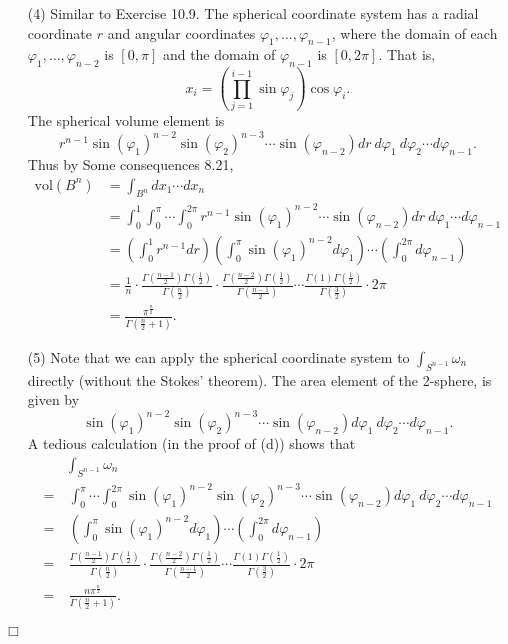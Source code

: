 \documentclass{article}
\begin{document}
\begin{enumerate}
\item[(4)]
  Similar to Exercise 10.9.
  The spherical coordinate system has a radial coordinate $r$ and
  angular coordinates $\varphi_1, \ldots, \varphi_{n-1}$,
  where the domain of each $\varphi_1, \ldots, \varphi_{n-2}$ is $[0,\pi]$
  and the domain of $\varphi_{n-1}$ is $[0,2\pi]$.
  That is,
  \[
    x_i = \left( \prod_{j=1}^{i-1} \sin\varphi_j \right) \cos\varphi_i.
  \]
  The spherical volume element is
  \[
    r^{n-1} \sin(\varphi_1)^{n-2} \sin(\varphi_2)^{n-3} \cdots \sin(\varphi_{n-2})
    dr \: d\varphi_1 \: d\varphi_2 \cdots d\varphi_{n-1}.
  \]
  Thus by Some consequences 8.21,
  \begin{align*}
    \mathrm{vol}(B^n)
    &= \int_{B^{n}} dx_1 \cdots dx_n \\
    &= \int_{0}^{1} \int_{0}^{\pi} \cdots \int_{0}^{2\pi}
      r^{n-1} \sin(\varphi_1)^{n-2} \cdots \sin(\varphi_{n-2})
      dr \: d\varphi_1 \cdots d\varphi_{n-1} \\
    &= \left( \int_{0}^{1} r^{n-1} dr \right)
      \left(\int_{0}^{\pi} \sin(\varphi_1)^{n-2} d\varphi_1 \right)
      \cdots
      \left(\int_{0}^{2\pi} d\varphi_{n-1} \right) \\
    &= \frac{1}{n}
      \cdot \frac{\Gamma(\frac{n-1}{2})\Gamma(\frac{1}{2})}{\Gamma(\frac{n}{2})}
      \cdot \frac{\Gamma(\frac{n-2}{2})\Gamma(\frac{1}{2})}{\Gamma(\frac{n-1}{2})}
      \cdots
      \frac{\Gamma(1)\Gamma(\frac{1}{2})}{\Gamma(\frac{3}{2})} \cdot 2\pi \\
    &= \frac{\pi^{\frac{n}{2}}}{\Gamma\left(\frac{n}{2}+1\right)}.
  \end{align*}

\item[(5)]
  Note that we can apply the spherical coordinate system
  to $\int_{S^{n-1}} \omega_n$ directly (without the Stokes' theorem).
  The area element of the 2-sphere, is given by
  \[
    \sin(\varphi_1)^{n-2} \sin(\varphi_2)^{n-3} \cdots \sin(\varphi_{n-2})
    d\varphi_1 \: d\varphi_2 \cdots d\varphi_{n-1}.
  \]
  A tedious calculation (in the proof of (d)) shows that
  \begin{align*}
    &\int_{S^{n-1}} \omega_n \\
    =& \: \int_{0}^{\pi} \cdots \int_{0}^{2\pi}
      \sin(\varphi_1)^{n-2} \sin(\varphi_2)^{n-3} \cdots \sin(\varphi_{n-2})
      d\varphi_1 \: d\varphi_2 \cdots d\varphi_{n-1} \\
    =& \: \left(\int_{0}^{\pi} \sin(\varphi_1)^{n-2} d\varphi_1 \right)
      \cdots
      \left(\int_{0}^{2\pi} d\varphi_{n-1} \right) \\
    =& \: \frac{\Gamma(\frac{n-1}{2})\Gamma(\frac{1}{2})}{\Gamma(\frac{n}{2})}
      \cdot \frac{\Gamma(\frac{n-2}{2})\Gamma(\frac{1}{2})}{\Gamma(\frac{n-1}{2})}
      \cdots
      \frac{\Gamma(1)\Gamma(\frac{1}{2})}{\Gamma(\frac{3}{2})} \cdot 2\pi \\
    =& \: \frac{n\pi^{\frac{n}{2}}}{\Gamma\left(\frac{n}{2}+1\right)}.
  \end{align*}
\end{enumerate}
$\Box$ \\
\end{document}
